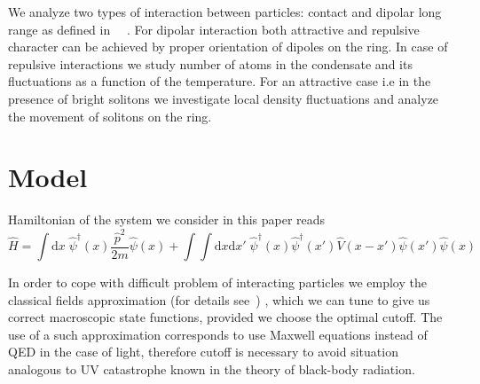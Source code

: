 \documentclass[aps,pra,reprint]{revtex4-2}
\begin{document}
     We analyze two types of interaction between particles: contact and dipolar long range as defined in ~\cite{sinha2007cold}~\cite{PhysRevA.61.041604}. %
    For dipolar interaction both attractive and repulsive character can be achieved by proper orientation of dipoles on the ring. 
    In case of repulsive interactions we study number of atoms in the condensate and its fluctuations as a function of the temperature. For an attractive case i.e in the presence of bright solitons we investigate local density fluctuations and analyze the movement of solitons on the ring.
\section{Model}
    Hamiltonian of the system we consider in this paper reads
    \begin{equation}
    \label{H}
        \hat{H} = \int \mathrm{d}x \; {\hat{\psi}}^{\dag}(x) \frac{\hat{p}^2}{2m} \hat{\psi}(x) + \int \int \mathrm{d}x \mathrm{d}x' \; {\hat{\psi}}^{\dag}(x) {\hat{\psi}}^{\dag}(x') \hat{V}(x-x')\hat{\psi}(x') \hat{\psi}(x)
    \end{equation}
    
    In order to cope with difficult problem of interacting particles we employ the classical fields approximation (for details see~\cite{brewczyk2007classical}) , which we can tune to give us correct macroscopic state functions, provided we choose the optimal cutoff.
    The use of a such approximation corresponds to use Maxwell equations instead of QED in the case of light, therefore cutoff is necessary to avoid situation analogous to UV catastrophe known in the theory of black-body radiation.
    
\end{document}
